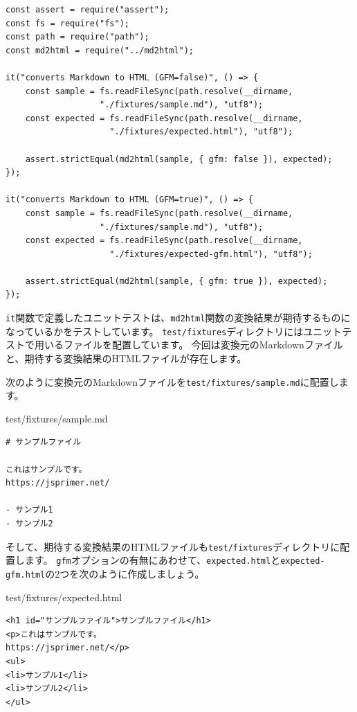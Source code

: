 \begin{lstlisting}
const assert = require("assert");
const fs = require("fs");
const path = require("path");
const md2html = require("../md2html");

it("converts Markdown to HTML (GFM=false)", () => {
    const sample = fs.readFileSync(path.resolve(__dirname, 
                   "./fixtures/sample.md"), "utf8");
    const expected = fs.readFileSync(path.resolve(__dirname, 
                     "./fixtures/expected.html"), "utf8");

    assert.strictEqual(md2html(sample, { gfm: false }), expected);
});

it("converts Markdown to HTML (GFM=true)", () => {
    const sample = fs.readFileSync(path.resolve(__dirname, 
                   "./fixtures/sample.md"), "utf8");
    const expected = fs.readFileSync(path.resolve(__dirname, 
                     "./fixtures/expected-gfm.html"), "utf8");

    assert.strictEqual(md2html(sample, { gfm: true }), expected);
});
\end{lstlisting}

\texttt{it}関数で定義したユニットテストは、\texttt{md2html}関数の変換結果が期待するものになっているかをテストしています。
\texttt{test/fixtures}ディレクトリにはユニットテストで用いるファイルを配置しています。
今回は変換元のMarkdownファイルと、期待する変換結果のHTMLファイルが存在します。

次のように変換元のMarkdownファイルを\texttt{test/fixtures/sample.md}に配置します。

\begin{listtitle}
test/fixtures/sample.md
\end{listtitle}
\begin{lstlisting}
# サンプルファイル

これはサンプルです。
https://jsprimer.net/

- サンプル1
- サンプル2
\end{lstlisting}
\listend

そして、期待する変換結果のHTMLファイルも\texttt{test/fixtures}ディレクトリに配置します。
\texttt{gfm}オプションの有無にあわせて、\texttt{expected.html}と\texttt{expected-gfm.html}の2つを次のように作成しましょう。

\begin{listtitle}
test/fixtures/expected.html
\end{listtitle}
\begin{lstlisting}
<h1 id="サンプルファイル">サンプルファイル</h1>
<p>これはサンプルです。
https://jsprimer.net/</p>
<ul>
<li>サンプル1</li>
<li>サンプル2</li>
</ul>
\end{lstlisting}
\listend

